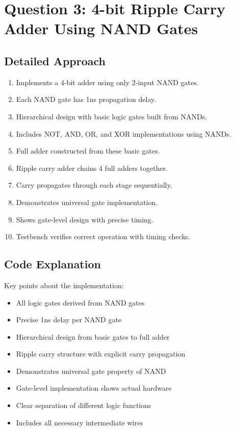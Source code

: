 \documentclass{article}
\begin{document}
\section{Question 3: 4-bit Ripple Carry Adder Using NAND Gates}

\subsection{Detailed Approach}
\begin{enumerate}
    \item Implements a 4-bit adder using only 2-input NAND gates.
    \item Each NAND gate has 1ns propagation delay.
    \item Hierarchical design with basic logic gates built from NANDs.
    \item Includes NOT, AND, OR, and XOR implementations using NANDs.
    \item Full adder constructed from these basic gates.
    \item Ripple carry adder chains 4 full adders together.
    \item Carry propagates through each stage sequentially.
    \item Demonstrates universal gate implementation.
    \item Shows gate-level design with precise timing.
    \item Testbench verifies correct operation with timing checks.
\end{enumerate}

\subsection{Code Explanation}
Key points about the implementation:
\begin{itemize}
    \item All logic gates derived from NAND gates
    \item Precise 1ns delay per NAND gate
    \item Hierarchical design from basic gates to full adder
    \item Ripple carry structure with explicit carry propagation
    \item Demonstrates universal gate property of NAND
    \item Gate-level implementation shows actual hardware
    \item Clear separation of different logic functions
    \item Includes all necessary intermediate wires
\end{itemize}
\end{document}
